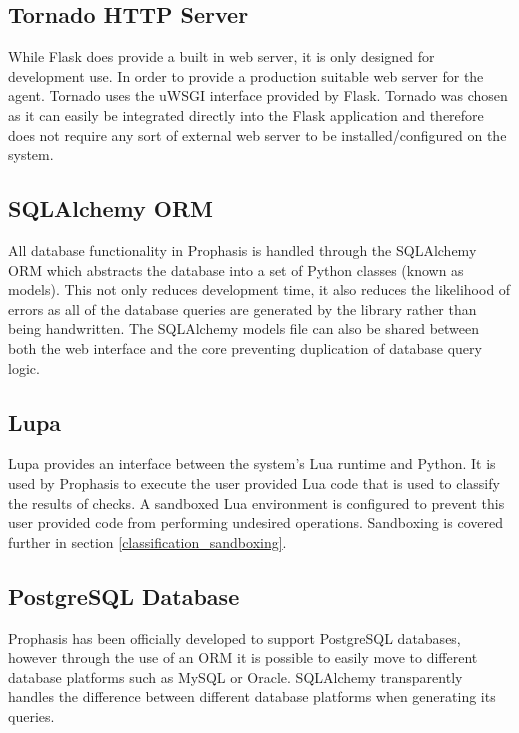 \documentclass[bsc,deptreport,twoside,parskip,singlespacing,notimes]{infthesis}
\begin{document}
\subsection{Tornado HTTP Server}

	While Flask does provide a built in web server, it is only designed for
	development	use.  In order to provide a production suitable web server for the
	agent.  Tornado uses the uWSGI interface provided by Flask.  Tornado was chosen
	as it can easily be integrated directly into the Flask application and
	therefore does not require any sort of external web server to be
	installed/configured on the system.

\subsection{SQLAlchemy ORM}

	All database functionality in Prophasis is handled through the SQLAlchemy ORM
	which abstracts the database into a set of Python classes (known as models).
	This not only reduces development time, it also reduces the likelihood of
	errors as all of the database queries are generated by the library rather than
	being handwritten.  The SQLAlchemy models file can also be shared between both
	the web interface and the core preventing duplication of database query logic.

\subsection{Lupa}

	Lupa provides an interface between the system's Lua runtime and Python.  It is
	used by Prophasis to execute the user provided Lua code that is used to
	classify the results of checks. A sandboxed Lua environment is configured to
	prevent this user provided code from performing undesired operations.
	Sandboxing is covered further in section \ref{classification_sandboxing}.

\subsection{PostgreSQL Database}

	Prophasis has been officially developed to support PostgreSQL databases,
	however through the use of an ORM it is possible to easily move to different
	database platforms such as MySQL or Oracle.  SQLAlchemy transparently handles
	the difference between different database platforms when generating its
	queries.
\end{document}
